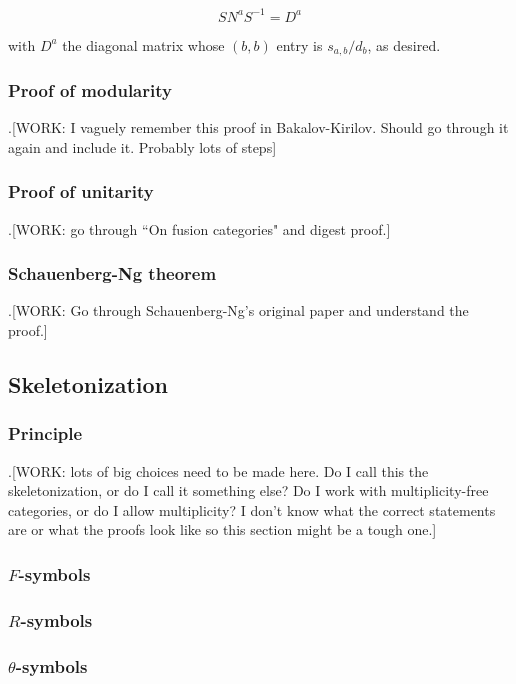 $$S N^a S^{-1}=D^a$$

with $D^a$ the diagonal matrix whose $(b,b)$ entry is $s_{a,b}/d_b$, as desired.


\subsubsection{Proof of modularity}

.[WORK: I vaguely remember this proof in Bakalov-Kirilov. Should go through it again and include it. Probably lots of steps]

\subsubsection{Proof of unitarity}

.[WORK: go through ``On fusion categories" and digest proof.]

\subsubsection{Schauenberg-Ng theorem}

.[WORK: Go through Schauenberg-Ng's original paper and understand the proof.]


\subsection{Skeletonization}

\subsubsection{Principle}

.[WORK: lots of big choices need to be made here. Do I call this the skeletonization, or do I call it something else? Do I work with multiplicity-free categories, or do I allow multiplicity? I don't know what the correct statements are or what the proofs look like so this section might be a tough one.]

\subsubsection{$F$-symbols}

\subsubsection{$R$-symbols}

\subsubsection{$\theta$-symbols}

